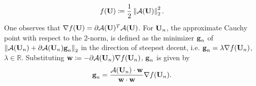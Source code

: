 \begin{equation}
	f(\textbf{U}) \coloneqq \frac{1}{2}  \left\| \mathcal{A}(\textbf{U})  \right\|^2_2 .
\end{equation}
One observes that $\nabla f(\textbf{U}) = \partial \mathcal{A}(\textbf{U})^T \mathcal{A}(\textbf{U})$.
For $\textbf{U}_n$, the approximate Cauchy point with respect to the 2-norm,
is defined as the minimizer $\textbf{g}_n$ of
$ \left\|  \mathcal{A}(\textbf{U}_{n}) + \partial \mathcal{A} (\textbf{U}_n) \textbf{g}_n \right\|_2  $
in the direction of steepest decent, i.e. $\textbf{g}_n = \lambda \nabla f(\textbf{U}_n)$, $\lambda \in \mathbb{R}$.
Substituting $\textbf{w} \coloneqq - \partial \mathcal{A}(\textbf{U}_n) \nabla f(\textbf{U}_n)$, $\textbf{g}_n$ is given by
\begin{equation}
	\textbf{g}_n = \frac{\mathcal{A}(\textbf{U}_n) \cdot \textbf{w}}{\textbf{w} \cdot \textbf{w}} \nabla f(\textbf{U}_n) .
	\label{eq:CauchyPoint}
\end{equation}

